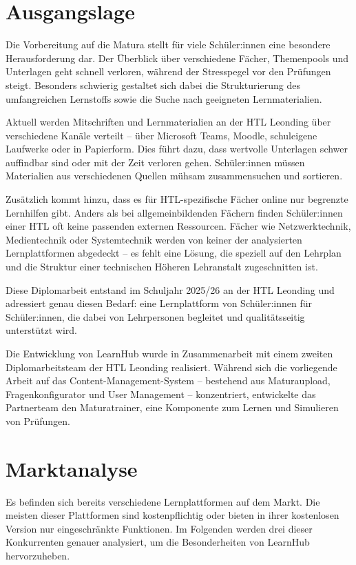 \setauthor{\firstauthor}

\section{Ausgangslage}

Die Vorbereitung auf die Matura stellt für viele Schüler:innen eine besondere
Herausforderung dar. Der Überblick über verschiedene Fächer, Themenpools und
Unterlagen geht schnell verloren, während der Stresspegel vor den Prüfungen
steigt. Besonders schwierig gestaltet sich dabei die Strukturierung des
umfangreichen Lernstoffs sowie die Suche nach geeigneten Lernmaterialien.

Aktuell werden Mitschriften und Lernmaterialien an der HTL Leonding über
verschiedene Kanäle verteilt -- über Microsoft Teams, Moodle, schuleigene
Laufwerke oder in Papierform. Dies führt dazu, dass wertvolle Unterlagen
schwer auffindbar sind oder mit der Zeit verloren gehen. Schüler:innen müssen
Materialien aus verschiedenen Quellen mühsam zusammensuchen und sortieren.

Zusätzlich kommt hinzu, dass es für HTL-spezifische Fächer online nur
begrenzte Lernhilfen gibt. Anders als bei allgemeinbildenden Fächern finden
Schüler:innen einer HTL oft keine passenden externen Ressourcen. Fächer wie
Netzwerktechnik, Medientechnik oder Systemtechnik werden von keiner der
analysierten Lernplattformen abgedeckt -- es fehlt eine Lösung, die speziell auf
den Lehrplan und die Struktur einer technischen Höheren Lehranstalt zugeschnitten
ist.

Diese Diplomarbeit entstand im Schuljahr 2025/26 an der HTL Leonding und adressiert
genau diesen Bedarf: eine Lernplattform von Schüler:innen für Schüler:innen, die
dabei von Lehrpersonen begleitet und qualitätsseitig unterstützt wird.

Die Entwicklung von LearnHub wurde in Zusammenarbeit mit einem zweiten
Diplomarbeitsteam der HTL Leonding realisiert. Während sich die vorliegende
Arbeit auf das Content-Management-System -- bestehend aus Maturaupload,
Fragenkonfigurator und User Management -- konzentriert, entwickelte das
Partnerteam den Maturatrainer, eine Komponente zum Lernen und Simulieren
von Prüfungen.

\section{Marktanalyse}
Es befinden sich bereits verschiedene Lernplattformen auf dem Markt. Die meisten
dieser Plattformen sind kostenpflichtig oder bieten in ihrer kostenlosen Version
nur eingeschränkte Funktionen. Im Folgenden werden drei dieser Konkurrenten
genauer analysiert, um die Besonderheiten von LearnHub hervorzuheben.
 
